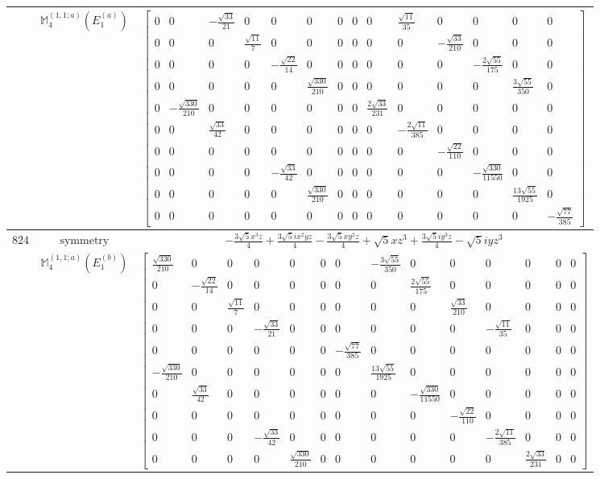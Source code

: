 \documentclass[fleqn,8pt,landscape]{jsarticle}
\begin{document}
\begin{longtable}{ccc}
$  $ & $ \mathbb{M}_{4}^{(1,1;a)}(E_{1}^{(a)}) $ & $ \begin{bmatrix} 0 & 0 & - \frac{\sqrt{33}}{21} & 0 & 0 & 0 & 0 & 0 & 0 & \frac{\sqrt{11}}{35} & 0 & 0 & 0 & 0 \\ 0 & 0 & 0 & \frac{\sqrt{11}}{7} & 0 & 0 & 0 & 0 & 0 & 0 & - \frac{\sqrt{33}}{210} & 0 & 0 & 0 \\ 0 & 0 & 0 & 0 & - \frac{\sqrt{22}}{14} & 0 & 0 & 0 & 0 & 0 & 0 & - \frac{2 \sqrt{55}}{175} & 0 & 0 \\ 0 & 0 & 0 & 0 & 0 & \frac{\sqrt{330}}{210} & 0 & 0 & 0 & 0 & 0 & 0 & \frac{3 \sqrt{55}}{350} & 0 \\ 0 & - \frac{\sqrt{330}}{210} & 0 & 0 & 0 & 0 & 0 & 0 & \frac{2 \sqrt{33}}{231} & 0 & 0 & 0 & 0 & 0 \\ 0 & 0 & \frac{\sqrt{33}}{42} & 0 & 0 & 0 & 0 & 0 & 0 & - \frac{2 \sqrt{11}}{385} & 0 & 0 & 0 & 0 \\ 0 & 0 & 0 & 0 & 0 & 0 & 0 & 0 & 0 & 0 & - \frac{\sqrt{22}}{110} & 0 & 0 & 0 \\ 0 & 0 & 0 & 0 & - \frac{\sqrt{33}}{42} & 0 & 0 & 0 & 0 & 0 & 0 & - \frac{\sqrt{330}}{11550} & 0 & 0 \\ 0 & 0 & 0 & 0 & 0 & \frac{\sqrt{330}}{210} & 0 & 0 & 0 & 0 & 0 & 0 & \frac{13 \sqrt{55}}{1925} & 0 \\ 0 & 0 & 0 & 0 & 0 & 0 & 0 & 0 & 0 & 0 & 0 & 0 & 0 & - \frac{\sqrt{77}}{385} \end{bmatrix} $ \\ \hline
$ 824 $ & $ \text{symmetry} $ & $ - \frac{3 \sqrt{5} x^{3} z}{4} + \frac{3 \sqrt{5} i x^{2} y z}{4} - \frac{3 \sqrt{5} x y^{2} z}{4} + \sqrt{5} x z^{3} + \frac{3 \sqrt{5} i y^{3} z}{4} - \sqrt{5} i y z^{3} $ \\
$  $ & $ \mathbb{M}_{4}^{(1,1;a)}(E_{1}^{(b)}) $ & $ \begin{bmatrix} \frac{\sqrt{330}}{210} & 0 & 0 & 0 & 0 & 0 & 0 & - \frac{3 \sqrt{55}}{350} & 0 & 0 & 0 & 0 & 0 & 0 \\ 0 & - \frac{\sqrt{22}}{14} & 0 & 0 & 0 & 0 & 0 & 0 & \frac{2 \sqrt{55}}{175} & 0 & 0 & 0 & 0 & 0 \\ 0 & 0 & \frac{\sqrt{11}}{7} & 0 & 0 & 0 & 0 & 0 & 0 & \frac{\sqrt{33}}{210} & 0 & 0 & 0 & 0 \\ 0 & 0 & 0 & - \frac{\sqrt{33}}{21} & 0 & 0 & 0 & 0 & 0 & 0 & - \frac{\sqrt{11}}{35} & 0 & 0 & 0 \\ 0 & 0 & 0 & 0 & 0 & 0 & - \frac{\sqrt{77}}{385} & 0 & 0 & 0 & 0 & 0 & 0 & 0 \\ - \frac{\sqrt{330}}{210} & 0 & 0 & 0 & 0 & 0 & 0 & \frac{13 \sqrt{55}}{1925} & 0 & 0 & 0 & 0 & 0 & 0 \\ 0 & \frac{\sqrt{33}}{42} & 0 & 0 & 0 & 0 & 0 & 0 & - \frac{\sqrt{330}}{11550} & 0 & 0 & 0 & 0 & 0 \\ 0 & 0 & 0 & 0 & 0 & 0 & 0 & 0 & 0 & - \frac{\sqrt{22}}{110} & 0 & 0 & 0 & 0 \\ 0 & 0 & 0 & - \frac{\sqrt{33}}{42} & 0 & 0 & 0 & 0 & 0 & 0 & - \frac{2 \sqrt{11}}{385} & 0 & 0 & 0 \\ 0 & 0 & 0 & 0 & \frac{\sqrt{330}}{210} & 0 & 0 & 0 & 0 & 0 & 0 & \frac{2 \sqrt{33}}{231} & 0 & 0 \end{bmatrix} $ \\ \hline

\end{longtable}
\end{document}
